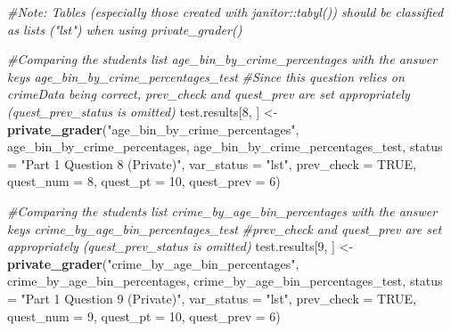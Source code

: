 \documentclass[
  12pt,
]{book}
\newenvironment{Shaded}{\begin{snugshade}}{\end{snugshade}}
\newcommand{\AttributeTok}[1]{\textcolor[rgb]{0.13,0.29,0.53}{#1}}
\newcommand{\CommentTok}[1]{\textcolor[rgb]{0.56,0.35,0.01}{\textit{#1}}}
\newcommand{\ConstantTok}[1]{\textcolor[rgb]{0.56,0.35,0.01}{#1}}
\newcommand{\DecValTok}[1]{\textcolor[rgb]{0.00,0.00,0.81}{#1}}
\newcommand{\FunctionTok}[1]{\textcolor[rgb]{0.13,0.29,0.53}{\textbf{#1}}}
\newcommand{\NormalTok}[1]{#1}
\newcommand{\OtherTok}[1]{\textcolor[rgb]{0.56,0.35,0.01}{#1}}
\newcommand{\StringTok}[1]{\textcolor[rgb]{0.31,0.60,0.02}{#1}}
\begin{document}
\begin{Shaded}
\begin{Highlighting}[]
\CommentTok{\#Note: Tables (especially those created with \textasciigrave{}janitor::tabyl()\textasciigrave{}) should be classified as lists ("lst") when using \textasciigrave{}private\_grader()\textasciigrave{}}

\CommentTok{\#Comparing the student\textquotesingle{}s list \textasciigrave{}age\_bin\_by\_crime\_percentages\textasciigrave{} with the answer key\textquotesingle{}s \textasciigrave{}age\_bin\_by\_crime\_percentages\_test\textasciigrave{} }
\CommentTok{\#Since this question relies on \textasciigrave{}crimeData\textasciigrave{} being correct, \textasciigrave{}prev\_check\textasciigrave{} and \textasciigrave{}quest\_prev\textasciigrave{} are set appropriately (\textasciigrave{}quest\_prev\_status\textasciigrave{} is omitted)}
\NormalTok{test.results[}\DecValTok{8}\NormalTok{, ] }\OtherTok{\textless{}{-}} \FunctionTok{private\_grader}\NormalTok{(}\StringTok{"age\_bin\_by\_crime\_percentages"}\NormalTok{, age\_bin\_by\_crime\_percentages, age\_bin\_by\_crime\_percentages\_test, }
                                    \AttributeTok{status =} \StringTok{"Part 1 Question 8 (Private)"}\NormalTok{, }\AttributeTok{var\_status =} \StringTok{"lst"}\NormalTok{, }
                                    \AttributeTok{prev\_check =} \ConstantTok{TRUE}\NormalTok{, }\AttributeTok{quest\_num =} \DecValTok{8}\NormalTok{, }\AttributeTok{quest\_pt =} \DecValTok{10}\NormalTok{, }\AttributeTok{quest\_prev =} \DecValTok{6}\NormalTok{)}

\CommentTok{\#Comparing the student\textquotesingle{}s list \textasciigrave{}crime\_by\_age\_bin\_percentages\textasciigrave{} with the answer key\textquotesingle{}s \textasciigrave{}crime\_by\_age\_bin\_percentages\_test\textasciigrave{} }
\CommentTok{\#\textasciigrave{}prev\_check\textasciigrave{} and \textasciigrave{}quest\_prev\textasciigrave{} are set appropriately (\textasciigrave{}quest\_prev\_status\textasciigrave{} is omitted)}
\NormalTok{test.results[}\DecValTok{9}\NormalTok{, ] }\OtherTok{\textless{}{-}} \FunctionTok{private\_grader}\NormalTok{(}\StringTok{"crime\_by\_age\_bin\_percentages"}\NormalTok{, crime\_by\_age\_bin\_percentages, crime\_by\_age\_bin\_percentages\_test, }
                                    \AttributeTok{status =} \StringTok{"Part 1 Question 9 (Private)"}\NormalTok{, }\AttributeTok{var\_status =} \StringTok{"lst"}\NormalTok{, }
                                    \AttributeTok{prev\_check =} \ConstantTok{TRUE}\NormalTok{, }\AttributeTok{quest\_num =} \DecValTok{9}\NormalTok{, }\AttributeTok{quest\_pt =} \DecValTok{10}\NormalTok{, }\AttributeTok{quest\_prev =} \DecValTok{6}\NormalTok{)}
\end{Highlighting}
\end{Shaded}
\end{document}
